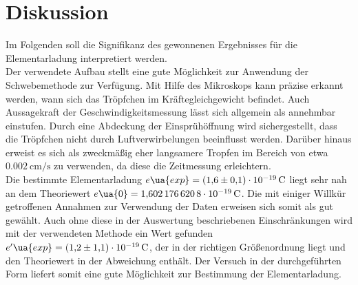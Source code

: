 \section{Diskussion}
Im Folgenden soll die Signifikanz des gewonnenen Ergebnisses für die Elementarladung interpretiert werden. \\
Der verwendete Aufbau stellt eine gute Möglichkeit zur Anwendung der Schwebemethode zur Verfügung. Mit Hilfe des Mikroskops
kann präzise erkannt werden, wann sich das Tröpfchen im Kräftegleichgewicht befindet. Auch Aussagekraft der Geschwindigkeitsmessung lässt
sich allgemein als annehmbar einstufen. Durch eine Abdeckung der Einsprühöffnung wird sichergestellt, dass die
Tröpfchen nicht durch Luftverwirbelungen beeinflusst werden. Darüber hinaus erweist es sich als zweckmäßig eher langsamere Tropfen
im Bereich von etwa $\SI{0.002}{\centi\meter \per \second}$ zu verwenden, da diese die Zeitmessung erleichtern. \\
Die bestimmte Elementarladung $e\ua{exp} = \SI{+1.6(1)e-19}{\coulomb}$ liegt sehr nah an dem Theoriewert
$e\ua{0} = \SI{1.6021766208e-19}{\coulomb}$. Die mit einiger Willkür getroffenen Annahmen zur Verwendung der Daten erweisen sich
somit als gut gewählt. Auch ohne diese in der Auswertung beschriebenen Einschränkungen wird mit der verwendeten Methode ein Wert gefunden
$e'\ua{exp} = \SI{+1.2(11)e-19}{\coulomb}$, der in der richtigen Größenordnung liegt und den Theoriewert in der Abweichung enthält.
Der Versuch in der durchgeführten Form liefert somit eine gute Möglichkeit zur Bestimmung der Elementarladung.
